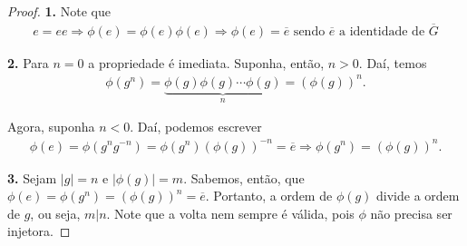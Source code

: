 	\begin{proof}
		\textbf{1.} Note que 
		\begin{align*}
		    e = ee \Rightarrow \phi(e) = \phi(e)\phi(e) \Rightarrow \phi(e) = \overline{e}
		    \text{ sendo $\overline{e}$ a identidade de $\overline{G}$}
		\end{align*}
		\par\vspace{0.3cm}\hspace{17pt}\textbf{2.} Para $n = 0$ a propriedade é imediata. 
		Suponha, então, $n>0$. Daí, temos
		\begin{align*}
		    \phi(g^n) = \underbrace{\phi(g)\phi(g)\cdots\phi(g)}_{n} = (\phi(g))^n.
		\end{align*} 
		\par\vspace{0.3cm} Agora, suponha $n<0$. Daí, podemos escrever
		\begin{align*}
		    \phi(e) = \phi(g^ng^{-n}) = \phi(g^n)(\phi(g))^{-n} = \overline{e} \Rightarrow \phi(g^n) = (\phi(g))^n.
		\end{align*}
		\par\vspace{0.3cm}\hspace{17pt}\textbf{3.} Sejam $|g| = n$ e $|\phi(g)| = m$. 
		Sabemos, então, que $\phi(e) = \phi(g^n) = (\phi(g))^n = \overline{e}$. 
		Portanto, a ordem de $\phi(g)$ divide a ordem de $g$, ou seja, $m|n$. Note que a volta nem sempre é
		válida, pois $\phi$ não precisa ser injetora.
		

\end{proof}
